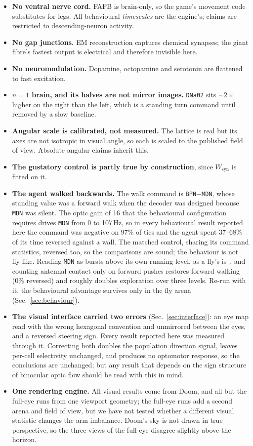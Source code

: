 \documentclass[10pt,twoside]{article}
\newcommand{\cell}[1]{\texttt{#1}}
\begin{document}
\begin{itemize}\itemsep2pt
\item \textbf{No ventral nerve cord.} FAFB is brain-only, so the game's
movement code substitutes for legs. All behavioural \emph{timescales} are the
engine's; claims are restricted to descending-neuron activity.
\item \textbf{No gap junctions.} EM reconstruction captures chemical synapses;
the giant fibre's fastest output is electrical and therefore invisible here.
\item \textbf{No neuromodulation.} Dopamine, octopamine and serotonin are
flattened to fast excitation.
\item \textbf{$n=1$ brain, and its halves are not mirror images.} \cell{DNa02}
sits ${\sim}2\times$ higher on the right than the left, which is a standing turn
command until removed by a slow baseline.
\item \textbf{Angular scale is calibrated, not measured.} The lattice is real
but its axes are not isotropic in visual angle, so each is scaled to the
published field of view. Absolute angular claims inherit this.
\item \textbf{The gustatory control is partly true by construction}, since
$W_{\mathrm{syn}}$ is fitted on it.
\item \textbf{The agent walked backwards.} The walk command is
\cell{BPN}$-$\cell{MDN}, whose standing value was a forward walk when the
decoder was designed because \cell{MDN} was silent. The optic gain of 16 that
the behavioural configuration requires drives \cell{MDN} from 0 to 107\,Hz,
so in every behavioural result reported here the command was negative on
$97\%$ of tics and the agent spent 37--68\% of its time reversed against a
wall. The matched control, sharing its command statistics, reversed too, so the
comparisons are sound; the behaviour is not fly-like. Reading \cell{MDN} as
bursts above its own running level, as a fly's is~\citep{bidaye2014}, and
counting antennal contact only on forward pushes restores forward walking
(0\% reversed) and roughly doubles exploration over three levels. Re-run with
it, the behavioural advantage survives only in the fly arena
(Sec.~\ref{sec:behaviour}).
\item \textbf{The visual interface carried two errors} (Sec.~\ref{sec:interface}):
an eye map read with the wrong hexagonal convention and unmirrored between the
eyes, and a reversed steering sign. Every result reported here was measured
through it. Correcting both doubles the population direction signal, leaves
per-cell selectivity unchanged, and produces no optomotor response, so the
conclusions are unchanged; but any result that depends on the sign structure of
binocular optic flow should be read with this in mind.
\item \textbf{One rendering engine.} All visual results come from Doom, and
all but the full-eye runs from one viewport geometry; the full-eye runs add a
second arena and field of view, but we have not tested whether a different
visual statistic changes the arm imbalance. Doom's sky is not drawn in true
perspective, so the three views of the full eye disagree slightly above the
horizon.
\end{itemize}
\end{document}
